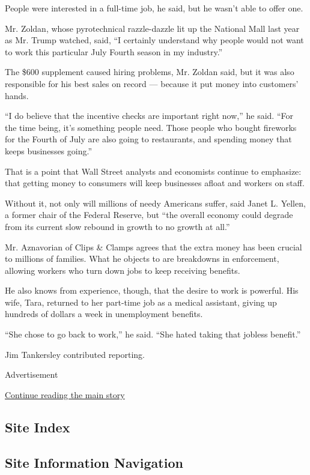 People were interested in a full-time job, he said, but he wasn't able
to offer one.

Mr. Zoldan, whose pyrotechnical razzle-dazzle lit up the National Mall
last year as Mr. Trump watched, said, ``I certainly understand why
people would not want to work this particular July Fourth season in my
industry.''

The \$600 supplement caused hiring problems, Mr. Zoldan said, but it was
also responsible for his best sales on record --- because it put money
into customers' hands.

``I do believe that the incentive checks are important right now,'' he
said. ``For the time being, it's something people need. Those people who
bought fireworks for the Fourth of July are also going to restaurants,
and spending money that keeps businesses going.''

That is a point that Wall Street analysts and economists continue to
emphasize: that getting money to consumers will keep businesses afloat
and workers on staff.

Without it, not only will millions of needy Americans suffer, said Janet
L. Yellen, a former chair of the Federal Reserve, but ``the overall
economy could degrade from its current slow rebound in growth to no
growth at all.''

Mr. Aznavorian of Clips \& Clamps agrees that the extra money has been
crucial to millions of families. What he objects to are breakdowns in
enforcement, allowing workers who turn down jobs to keep receiving
benefits.

He also knows from experience, though, that the desire to work is
powerful. His wife, Tara, returned to her part-time job as a medical
assistant, giving up hundreds of dollars a week in unemployment
benefits.

``She chose to go back to work,'' he said. ``She hated taking that
jobless benefit.''

Jim Tankersley contributed reporting.

Advertisement

\protect\hyperlink{after-bottom}{Continue reading the main story}

\hypertarget{site-index}{%
\subsection{Site Index}\label{site-index}}

\hypertarget{site-information-navigation}{%
\subsection{Site Information
Navigation}\label{site-information-navigation}}

